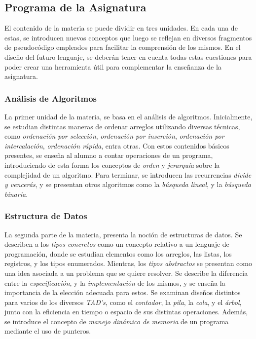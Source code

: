 \subsection{Programa de la Asignatura}

El contenido de la materia se puede dividir en tres unidades.
En cada una de estas, se introducen nuevos conceptos que luego se reflejan en diversos fragmentos de pseudocódigo empleados para facilitar la comprensión de los mismos.
En el diseño del futuro lenguaje, se deberán tener en cuenta todas estas cuestiones para poder crear una herramienta útil para complementar la enseñanza de la asignatura.

\subsubsection{Análisis de Algoritmos}

La primer unidad de la materia, se basa en el análisis de algoritmos.
Inicialmente, se estudian distintas maneras de ordenar arreglos utilizando diversas técnicas, como \textit{ordenación por selección}, \textit{ordenación por inserción}, \textit{ordenación por intercalación}, \textit{ordenación rápida}, entra otras.
Con estos contenidos básicos presentes, se enseña al alumno a contar operaciones de un programa, introduciendo de esta forma los conceptos de \textit{orden} y \textit{jerarquía} sobre la complejidad de un algoritmo.
Para terminar, se introducen las recurrencias \textit{divide y vencerás}, y se presentan otros algoritmos como la \textit{búsqueda lineal}, y la \textit{búsqueda binaria}.

\subsubsection{Estructura de Datos}

La segunda parte de la materia, presenta la noción de estructuras de datos.
Se describen a los \textit{tipos concretos} como un concepto relativo a un lenguaje de programación, donde se estudian elementos como los arreglos, las listas, los registros, y los tipos enumerados.
Mientras, los \textit{tipos abstractos} se presentan como una idea asociada a un problema que se quiere resolver.
Se describe la diferencia entre la \textit{especificación}, y la \textit{implementación} de los mismos, y se enseña la importancia de la elección adecuada para estos.
Se examinan diseños distintos para varios de los diversos \textit{TAD's}, como el \textit{contador}, la \textit{pila}, la \textit{cola}, y el \textit{árbol}, junto con la eficiencia en tiempo o espacio de sus distintas operaciones.
Además, se introduce el concepto de \textit{manejo dinámico de memoria} de un programa mediante el uso de punteros.


